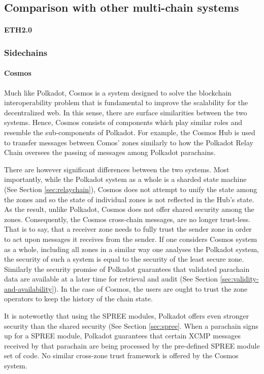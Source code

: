 \subsection{Comparison with other multi-chain systems}\label{sec:comparison}
\paragraph{ETH2.0}

\subsubsection{Sidechains}
\paragraph{Cosmos} 

Much like Polkadot, Cosmos is a system designed to solve the blockchain interoperability problem that is fundamental to improve the scalability for the decentralized web. In this sense, there are surface similarities between the two systems. Hence, Cosmos consists of components which play similar roles and resemble the sub-components of Polkadot. For example, the Cosmos Hub is used to transfer messages between Comos' zones similarly to how the Polkadot Relay Chain oversees the passing of messages among Polkadot parachains.

There are however significant differences between the two systems. Most importantly, while the Polkadot system as a whole is a sharded state machine (See Section \ref{sec:relaychain}), Cosmos does not attempt to unify the state among the zones and so the state of individual zones is not reflected in the Hub's state. As the result, unlike Polkadot, Cosmos does not offer shared security among the zones. Consequently, the Cosmos cross-chain messages, are no longer trust-less. That is to say, that a receiver zone needs to fully trust the sender zone in order to act upon messages it receives from the sender. If one considers Cosmos system as a whole, including all zones in a similar way one analyses the Polkadot system, the security of such a system is equal to the security of the least secure zone. Similarly the security promise of Polkadot guarantees that validated parachain data are available at a later time for retrieval and audit (See Section \ref{sec:validity-and-availability}). In the case of Cosmos, the users are ought to trust the zone operators to keep the history of the chain state.

It is noteworthy that using the SPREE modules, Polkadot offers even stronger security than the shared security (See Section \ref{sec:spree}. When a parachain signs up for a SPREE module, Polkadot guarantees that certain XCMP messages received by that parachain are being processed by the pre-defined SPREE module set of code. No similar cross-zone trust framework is offered by the Cosmos system.

